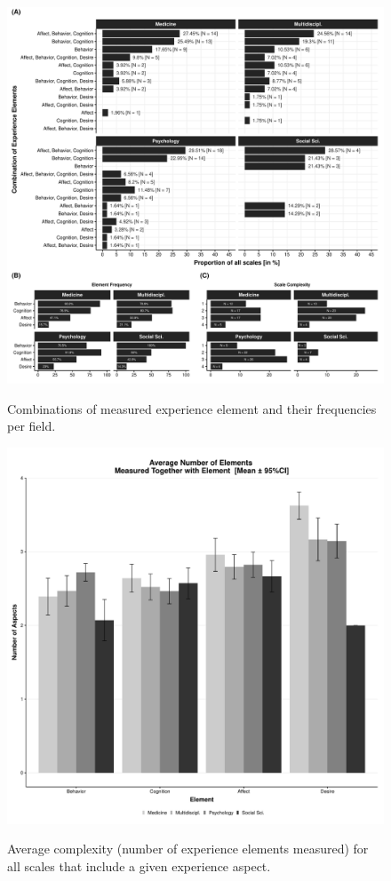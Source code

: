 \begin{figure}[h]
\centering
\caption{Combinations of measured experience element and their frequencies per field.}
\includegraphics[width=\textwidth]{Figures/FieldPlotFreq-1}
\label{fig:FieldPlotFreq}
\end{figure}

\begin{figure}[h]
\centering
\caption{Average complexity (number of experience elements measured) for all scales that include a given experience aspect.}
\includegraphics[width=\textwidth]{Figures/FieldElementComp-1}
\label{fig:FieldElementComp}
\end{figure}

